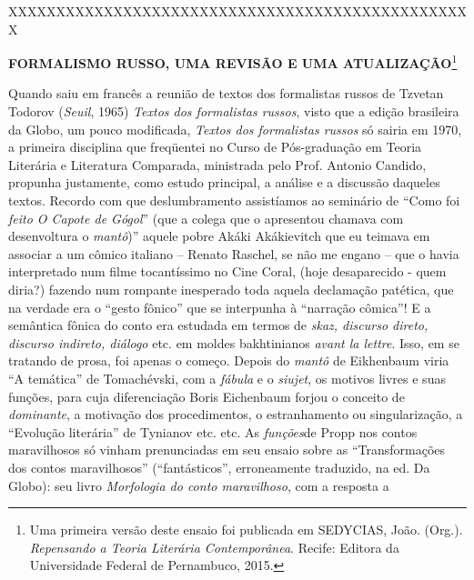 XXXXXXXXXXXXXXXXXXXXXXXXXXXXXXXXXXXXXXXXXXXXXXXXX

\textbf{FORMALISMO RUSSO, UMA REVISÃO E UMA ATUALIZAÇÃO}\footnote{Uma
  primeira versão deste ensaio foi publicada em SEDYCIAS, João. (Org.).
  \emph{Repensando a Teoria Literária Contemporânea}. Recife: Editora da
  Universidade Federal de Pernambuco, 2015.}

Quando saiu em francês a reunião de textos dos formalistas russos de
Tzvetan Todorov (\emph{Seuil}, 1965) \emph{Textos dos formalistas
russos}, visto que a edição brasileira da Globo, um pouco modificada,
\emph{Textos dos formalistas russos} só sairia em 1970, a primeira
disciplina que freqüentei no Curso de Pós-graduação em Teoria Literária
e Literatura Comparada, ministrada pelo Prof. Antonio Candido, propunha
justamente, como estudo principal, a análise e a discussão daqueles
textos. Recordo com que deslumbramento assistíamos ao seminário de
``Como foi \emph{feito O Capote de Gógol}'' (que a colega que o
apresentou chamava com desenvoltura o \emph{mantô})'' aquele pobre Akáki
Akákievitch que eu teimava em associar a um cômico italiano -- Renato
Raschel, se não me engano -- que o havia interpretado num filme
tocantíssimo no Cine Coral, (hoje desaparecido - quem diria?) fazendo
num rompante inesperado toda aquela declamação patética, que na verdade
era o ``gesto fônico'' que se interpunha à ``narração cômica''! E a
semântica fônica do conto era estudada em termos de \emph{skaz, discurso
direto, discurso indireto, diálogo} etc. em moldes bakhtinianos
\emph{avant la lettre}. Isso, em se tratando de prosa, foi apenas o
começo. Depois do \emph{mantô} de Eikhenbaum viria ``A temática'' de
Tomachévski, com a \emph{fábula} e o \emph{siujet}, os motivos livres e
suas funções, para cuja diferenciação Boris Eichenbaum forjou o conceito
de \emph{dominante}, a motivação dos procedimentos, o estranhamento ou
singularização, a ``Evolução literária'' de Tynianov etc. etc. As
\emph{funções}de Propp nos contos maravilhosos só vinham prenunciadas em
seu ensaio sobre as ``Transformações dos contos maravilhosos''
(``fantásticos'', erroneamente traduzido, na ed. Da Globo): seu livro
\emph{Morfologia do conto maravilhoso}, com a resposta a
